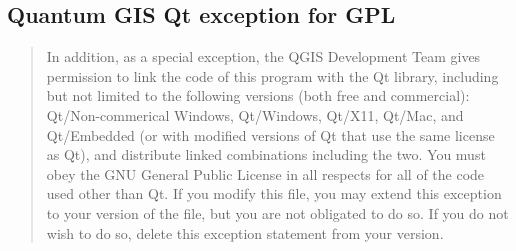 \subsection{Quantum GIS Qt exception for GPL}\label{qgis_qt_exception_appendix}

\begin{quotation}
In addition, as a special exception, the QGIS Development Team gives
permission to link the code of this program with the Qt library,
including but not limited to the following versions (both free and
commercial): Qt/Non-commerical Windows, Qt/Windows, Qt/X11, Qt/Mac, and
Qt/Embedded (or with modified versions of Qt that use the same license
as Qt), and distribute linked combinations including the two. You must
obey the GNU General Public License in all respects for all of the code
used other than Qt. If you modify this file, you may extend this
exception to your version of the file, but you are not obligated to do
so. If you do not wish to do so, delete this exception statement from
your version.
\end{quotation} 
